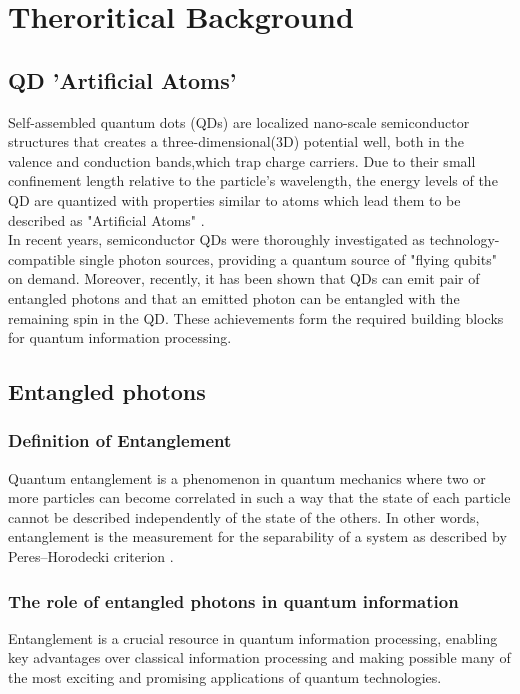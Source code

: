 \section{Theroritical Background}
\subsection{QD 'Artificial Atoms'}
Self-assembled quantum dots (QDs) are localized nano-scale semiconductor structures that creates a three-dimensional(3D) potential well, both in the valence and conduction bands,which trap charge carriers. Due to their small confinement length relative to the particle's wavelength, the energy levels of the QD are quantized with properties similar to atoms which lead them to be described as "Artificial Atoms" \cite{Kastner1993}. \\
In recent years, semiconductor QDs were thoroughly investigated as technology-compatible single photon sources, providing a quantum source of "flying qubits" on demand.\cite{Dekel2000,Michler2000,Michler2000_1,Yuan2002} Moreover, recently, it has been shown that QDs can emit pair of entangled photons \cite{Akopian2006,Hafenbrak2007} and that an emitted photon can be entangled with the remaining spin in the QD. \cite{Pelk2012,Schaibley2013,Gao2012} These achievements form the required building blocks for quantum information processing. \cite{DiVincenzo1998,Duan2001}\\
\subsection{Entangled photons}
\subsubsection{Definition of Entanglement}
Quantum entanglement is a phenomenon in quantum mechanics where two or more particles can become correlated in such a way that the state of each particle cannot be described independently of the state of the others. 
 In other words, entanglement is the measurement for the separability of a system as described by Peres–Horodecki criterion \cite{Peres1996}.\\
 
\subsubsection{The role of entangled photons in quantum information}
Entanglement is a crucial resource in quantum information processing, enabling key advantages over classical information processing and making possible many of the most exciting and promising applications of quantum technologies.
